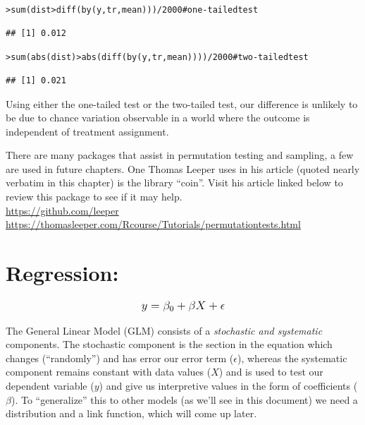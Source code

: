 \documentclass[12pt]{article}\usepackage[]{graphicx}\usepackage[]{color}
\makeatletter
\newcommand{\hlnum}[1]{\textcolor[rgb]{0.82,0.78,0.62}{#1}}%
\newcommand{\hlcom}[1]{\textcolor[rgb]{0.404,0.408,0.42}{#1}}%
\newcommand{\hlopt}[1]{\textcolor[rgb]{0.882,0.878,0.898}{#1}}%
\newcommand{\hlstd}[1]{\textcolor[rgb]{0.882,0.878,0.898}{#1}}%
\newcommand{\hlkwd}[1]{\textcolor[rgb]{0.733,0.388,0.812}{#1}}%
\newenvironment{kframe}{%
 \def\at@end@of@kframe{}%
 \ifinner\ifhmode%
  \def\at@end@of@kframe{\end{minipage}}%
  \begin{minipage}{\columnwidth}%
 \fi\fi%
 \def\FrameCommand##1{\hskip\@totalleftmargin \hskip-\fboxsep
 \colorbox{shadecolor}{##1}\hskip-\fboxsep
     \hskip-\linewidth \hskip-\@totalleftmargin \hskip\columnwidth}%
 \MakeFramed {\advance\hsize-\width
   \@totalleftmargin\z@ \linewidth\hsize
   \@setminipage}}%
 {\par\unskip\endMakeFramed%
 \at@end@of@kframe}
\newenvironment{knitrout}{}{} %
\makeatother
\begin{document}
\begin{flushleft}
\begin{knitrout}
\color{fgcolor}\begin{kframe}
\begin{alltt}
\hlstd{> }\hlkwd{sum}\hlstd{(dist} \hlopt{>} \hlkwd{diff}\hlstd{(}\hlkwd{by}\hlstd{(y, tr, mean)))}\hlopt{/}\hlnum{2000}  \hlcom{# one-tailed test}
\end{alltt}
\begin{verbatim}
## [1] 0.012
\end{verbatim}
\begin{alltt}
\hlstd{> }\hlkwd{sum}\hlstd{(}\hlkwd{abs}\hlstd{(dist)} \hlopt{>} \hlkwd{abs}\hlstd{(}\hlkwd{diff}\hlstd{(}\hlkwd{by}\hlstd{(y, tr, mean))))}\hlopt{/}\hlnum{2000}  \hlcom{# two-tailed test}
\end{alltt}
\begin{verbatim}
## [1] 0.021
\end{verbatim}
\end{kframe}
\end{knitrout}

Using either the one-tailed test or the two-tailed test, our difference is unlikely to be due to chance variation observable in a world where the outcome is independent of treatment assignment.

There are many packages that assist in permutation testing and sampling, a few are used in future chapters. One Thomas Leeper uses in his article (quoted nearly verbatim in this chapter) is the library ``coin''. Visit his article linked below to review this package to see if it may help. \\


\noindent \url{https://github.com/leeper}
\noindent \url{https://thomasleeper.com/Rcourse/Tutorials/permutationtests.html}


\clearpage
\section{Regression:}

\begin{equation}
\mathlarger{ y = \beta_0 + \beta X + \epsilon }
\end{equation}

The General Linear Model (GLM) consists of a \textit{stochastic and systematic} components. The stochastic component is the section in the equation which changes (``randomly'') and has error our error term ($\epsilon$), whereas the systematic component remains constant with data values ($X$) and is used to test our dependent variable ($y$) and give us interpretive values in the form of coefficients ($\beta$). To ``generalize'' this to other models (as we'll see in this document) we need a distribution and a link function, which will come up later.


\end{flushleft}
\end{document}
